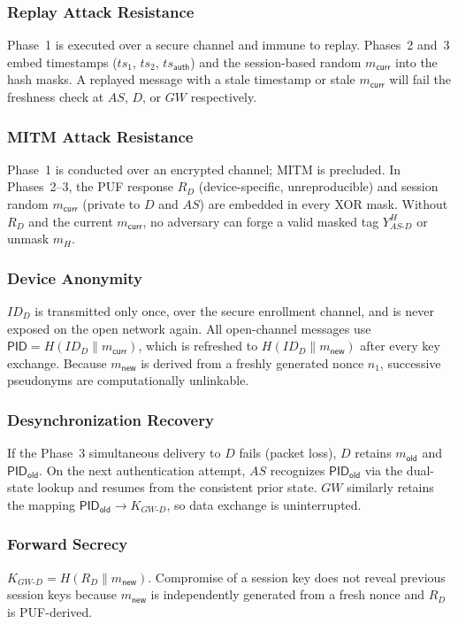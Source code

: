 \documentclass[conference]{IEEEtran}
\begin{document}
\subsubsection{Replay Attack Resistance}
Phase~1 is executed over a secure channel and immune to replay.  Phases~2
and~3 embed timestamps ($ts_1$, $ts_2$, $ts_\mathsf{auth}$) and the
session-based random $m_\mathsf{curr}$ into the hash masks.  A replayed
message with a stale timestamp or stale $m_\mathsf{curr}$ will fail the
freshness check at $AS$, $D$, or $GW$ respectively.

\subsubsection{MITM Attack Resistance}
Phase~1 is conducted over an encrypted channel; MITM is precluded.  In
Phases~2--3, the PUF response $R_D$ (device-specific, unreproducible) and
session random $m_\mathsf{curr}$ (private to $D$ and $AS$) are embedded in
every XOR mask.  Without $R_D$ and the current $m_\mathsf{curr}$, no
adversary can forge a valid masked tag $Y_{AS\text{-}D}^H$ or unmask $m_H$.

\subsubsection{Device Anonymity}
$ID_D$ is transmitted only once, over the secure enrollment channel, and is
never exposed on the open network again.  All open-channel messages use
$\mathsf{PID} = H(ID_D \| m_\mathsf{curr})$, which is refreshed to
$H(ID_D \| m_\mathsf{new})$ after every key exchange.  Because $m_\mathsf{new}$
is derived from a freshly generated nonce $n_1$, successive pseudonyms are
computationally unlinkable.

\subsubsection{Desynchronization Recovery}
If the Phase~3 simultaneous delivery to $D$ fails (packet loss), $D$ retains
$m_\mathsf{old}$ and $\mathsf{PID}_\mathsf{old}$.  On the next authentication
attempt, $AS$ recognizes $\mathsf{PID}_\mathsf{old}$ via the dual-state
lookup and resumes from the consistent prior state.  $GW$ similarly retains
the mapping $\mathsf{PID}_\mathsf{old} \to K_{GW\text{-}D}$, so data
exchange is uninterrupted.

\subsubsection{Forward Secrecy}
$K_{GW\text{-}D} = H(R_D \| m_\mathsf{new})$.  Compromise of a session key
does not reveal previous session keys because $m_\mathsf{new}$ is
independently generated from a fresh nonce and $R_D$ is PUF-derived.
\end{document}
